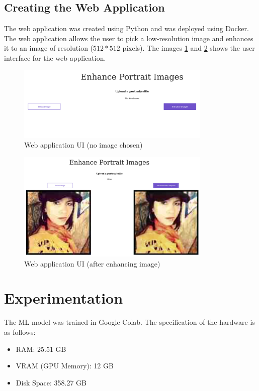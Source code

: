 \documentclass[conference]{IEEEtran}
\begin{document}
			
			
		\subsection{Creating the Web Application}
			The web application was created using Python and was deployed using Docker. The web application allows the user to pick a low-resolution image and enhances it to an image of resolution ($512 * 512$ pixels). The images \ref{appui1-fig} and \ref{appui2-fig} shows the user interface for the web application.
			\begin{figure}[htbp]
				\centerline{\includegraphics[width=25em]{webapp_ui1.png}}
				\caption{Web application UI (no image chosen)}
				\label{appui1-fig}
			\end{figure}
			\begin{figure}[htbp]
				\centerline{\includegraphics[width=25em]{webapp_ui2.png}}
				\caption{Web application UI (after enhancing image)}
				\label{appui2-fig}
			\end{figure}
		
		
	\section{Experimentation}
		The ML model was trained in Google Colab. The specification of the hardware is as follows:
		\begin{itemize}
			\item RAM: 25.51 GB
			\item VRAM (GPU Memory): 12 GB
			\item Disk Space: 358.27 GB
		\end{itemize}
		
\end{document}
